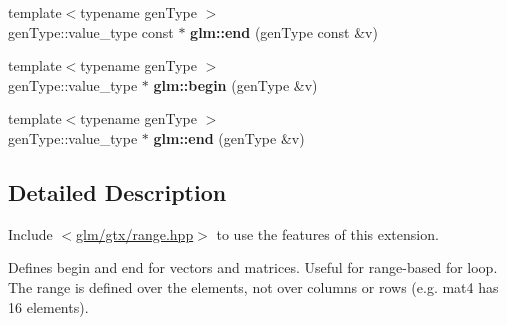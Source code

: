 \begin{DoxyCompactItemize}
{\footnotesize template$<$typename gen\+Type $>$ }\\gen\+Type\+::value\+\_\+type const  $\ast$ {\bfseries glm\+::end} (gen\+Type const \&v)
\item 
\mbox{\label{group__gtx__range_gacc3851df89b9238430e39525c3518ced}} 
{\footnotesize template$<$typename gen\+Type $>$ }\\gen\+Type\+::value\+\_\+type $\ast$ {\bfseries glm\+::begin} (gen\+Type \&v)
\item 
\mbox{\label{group__gtx__range_ga0c303e8c522b139252646a93d5e490d4}} 
{\footnotesize template$<$typename gen\+Type $>$ }\\gen\+Type\+::value\+\_\+type $\ast$ {\bfseries glm\+::end} (gen\+Type \&v)
\end{DoxyCompactItemize}


\subsection{Detailed Description}
Include $<$\hyperlink{range_8hpp}{glm/gtx/range.\+hpp}$>$ to use the features of this extension.

Defines begin and end for vectors and matrices. Useful for range-\/based for loop. The range is defined over the elements, not over columns or rows (e.\+g. mat4 has 16 elements). 